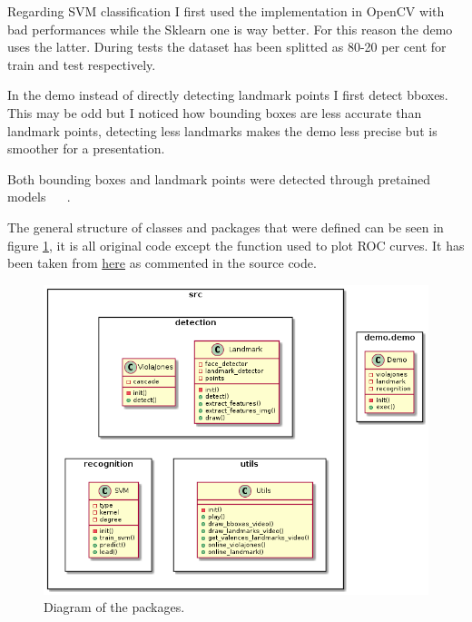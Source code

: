 Regarding SVM classification I first used the implementation in OpenCV with bad performances while the Sklearn one is way better. For this reason the demo uses the latter. 
During tests the dataset has been splitted as 80-20 per cent for train and test respectively.  

In the demo instead of directly detecting landmark points I first detect bboxes. 
This may be odd but I noticed how bounding boxes are less accurate than landmark points, detecting less landmarks makes the demo less precise but is smoother for a presentation. 

Both bounding boxes and landmark points were detected through pretained models ~\cite{dataset:haar} ~\cite{dataset:landmark}.

The general structure of classes and packages that were defined can be seen in figure \ref{fig:packages_diagram}, it is all original code except the function  used to plot ROC curves. It has been taken from \href{https://www.codespeedy.com/how-to-plot-roc-curve-using-sklearn-library-in-python/}{here} as commented in the source code.

\begin{figure}[h!t]
    \centering
    \includegraphics[scale=0.49]{../../diagrams/out/classes/classes.png}
    \caption{Diagram of the packages.}
    \label{fig:packages_diagram}
\end{figure}

